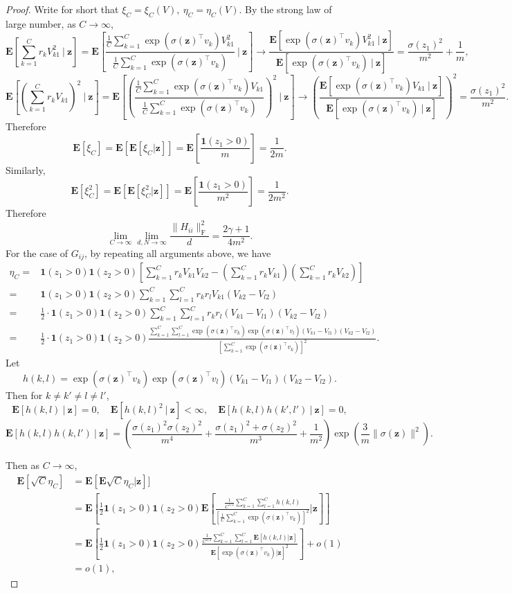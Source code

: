 \documentclass{article}
\newcommand{\E}{\mathbf{E}}
\newcommand\mf{\mathbf}
\newcommand{\rw}{\rightarrow}
\newcommand{\1}{^{(1)}}
\newcommand{\2}{^{(2)}}
\renewcommand{\l}{\left}
\renewcommand{\r}{\right}
\newcommand{\bea}{\begin{equation}\begin{aligned}}
\newcommand{\eea}{\end{aligned}\end{equation}}
\begin{document}
\begin{proof}
Write for short that $\xi_C=\xi_C(V),\ \eta_C=\eta_C(V)$. By the strong law of large number, as $C\rw \infty$,
$$
\E\l[\sum_{k=1}^C r_kV_{k1}^2\ \bigg|\ \mf{z}\r]=\E\l[\frac{\frac{1}{C}\sum_{k=1}^C\exp({\sigma(\mf{z})^\top v_k})V_{k1}^2}{\frac{1}{C}\sum_{k=1}^C\exp({\sigma(\mf{z})^\top v_k})}\ \bigg|\ \mf{z}\r]\rw \frac{\E[\exp({\sigma(\mf{z})^\top v_k})V_{k1}^2\ |\ \mf{z}]}{\E[\exp({\sigma(\mf{z})^\top v_k})\ |\ \mf{z}]}=\frac{\sigma(z_1)^2}{m^2}+\frac{1}{m},
$$
$$
\E\l[\l(\sum_{k=1}^C r_kV_{k1}\r)^2\ \bigg|\ \mf{z}\r]=\E\l[\l(\frac{\frac{1}{C}\sum_{k=1}^C\exp({\sigma(\mf{z})^\top v_k})V_{k1}}{\frac{1}{C}\sum_{k=1}^C\exp({\sigma(\mf{z})^\top v_k})}\r)^2\ \bigg|\ \mf{z}\r]\rw \l(\frac{\E[\exp({\sigma(\mf{z})^\top v_k})V_{k1}\ |\ \mf{z}]}{\E[\exp({\sigma(\mf{z})^\top v_k})\ |\ \mf{z}]}\r)^2=\frac{\sigma(z_1)^2}{m^2}.
$$
Therefore 
$$
\E[\xi_C]=\E[\E[\xi_C|\mf{z}]]=\E\l[\frac{\mf{1}(z_1>0)}{m}\r]=\frac{1}{2m}.
$$
Similarly,
$$
\E[\xi_C^2]=\E[\E[\xi_C^2|\mf{z}]]=\E\l[\frac{\mf{1}(z_1>0)}{m^2}\r]=\frac{1}{2m^2}.
$$
Therefore 
$$
\lim_{C\rw\infty}\lim_{d,N\rw\infty}\frac{\|H_{ii}\|_{\operatorname{F}}^2}{d}=\frac{2\gamma+1}{4m^2}.
$$
For the case of $G_{ij}$, by repeating all arguments above, we have
\bea
\eta_C=&\mf{1}(z_1>0)\mf{1}(z_2>0)\l[\sum_{k=1}^C r_kV_{k1}V_{k2}-\l(\sum_{k=1}^C r_k V_{k1}\r)\l(\sum_{k=1}^C r_k V_{k2}\r)\r]\\
=&\mf{1}(z_1>0)\mf{1}(z_2>0)\sum_{k=1}^C\sum_{l=1}^C r_k r_l V_{k1}(V_{k2}-V_{l2})\\
=&\frac{1}{2}\cdot\mf{1}(z_1>0)\mf{1}(z_2>0)\sum_{k=1}^C\sum_{l=1}^C r_k r_l (V_{k1}-V_{l1})(V_{k2}-V_{l2})\\
=&\frac{1}{2}\cdot\mf{1}(z_1>0)\mf{1}(z_2>0) \frac{\sum_{k=1}^C\sum_{l=1}^C \exp(\sigma(\mf{z})^\top v_k)\exp(\sigma(\mf{z})^\top v_l) (V_{k1}-V_{l1})(V_{k2}-V_{l2})}{\l[\sum_{k=1}^C \exp(\sigma(\mf{z})^\top v_k)\r]^2}.
\eea
Let 
$$
h(k,l)=\exp(\sigma(\mf{z})^\top v_k)\exp(\sigma(\mf{z})^\top v_l) (V_{k1}-V_{l1})(V_{k2}-V_{l2}).
$$
Then for $k\ne k'\ne l\ne l'$,
$$
\E[h(k,l)\ |\ \mf{z}]=0,\quad \E[h(k,l)^2\ |\ \mf{z}]<\infty,\quad
\E[h(k,l)h(k',l')\ |\ \mf{z}]=0,
$$
$$
\E[h(k,l)h(k,l')\ |\ \mf{z}]= \l(\frac{\sigma(z_1)^2\sigma(z_2)^2}{m^4}+\frac{\sigma(z_1)^2+\sigma(z_2)^2}{m^3}+\frac{1}{m^2}\r)\exp\l(\frac{3}{m}\|\sigma(\mf{z})\|^2\r).
$$

Then as $C\rw\infty$,
\bea
\E[\sqrt{C}\eta_C]&=\E[\E\sqrt{C}\eta_C|\mf{z}]]\\
&=\E\l[\frac{1}{2}\mf{1}(z_1>0)\mf{1}(z_2>0)\E\l[\frac{\frac{1}{C^{3/2}}\sum_{k=1}^C\sum_{l=1}^C h(k,l)}{\l[\frac{1}{C}\sum_{k=1}^C \exp(\sigma(\mf{z})^\top v_k)\r]^2}\bigg|\mf{z}\r]\r]\\
&=\E\l[\frac{1}{2}\mf{1}(z_1>0)\mf{1}(z_2>0)\frac{\frac{1}{C^{3/2}}\sum_{k=1}^C\sum_{l=1}^C\E\l[ h(k,l)\bigg|\mf{z}\r]}{\E\l[ \exp(\sigma(\mf{z})^\top v_k)\bigg|\mf{z}\r]^2}\r]+o(1)\\
&=o(1),
\eea


\end{proof}
\end{document}
